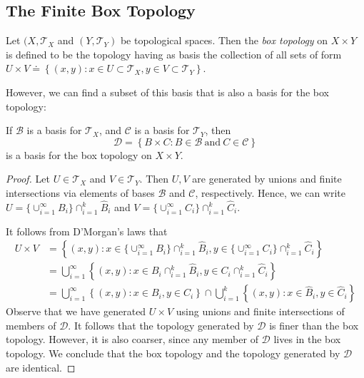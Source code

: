 \subsection{The Finite Box Topology}
\begin{definition}
\label{def:box_topology}
Let $(X, \mathcal{T}_{X}$ and $(Y, \mathcal{T}_{Y})$ be topological spaces.
Then the \emph{box topology} on $X \times Y$ is defined to be the
topology having as basis the collection of all sets of form
\(U \times V \doteq \left\{ (x,y): x \in U \subset
\mathcal{T}_{X}, y \in V \subset \mathcal{T}_{Y}  \right\}\).
\end{definition}
However, we can find a subset of this basis that is also a basis for the box
topology:
\begin{theorem}
\label{thm:box-basis}
If $\mathcal{B}$ is a basis for $\mathcal{T}_{X}$, and
$\mathcal{C}$ is a basis for $\mathcal{T}_{Y}$, then
\begin{equation*}
\mathcal{D} = \left\{ B \times C: B \in \mathcal{B} \ \text{and} \ C \in
\mathcal{C} \right\}
\end{equation*}
is a basis for the box topology on $X \times Y$.
\end{theorem}
\begin{proof}
Let $U \in \mathcal{T}_{X}$ and $V \in \mathcal{T}_{Y}$.
Then $U, V$ are generated by unions and finite intersections via
elements of bases $\mathcal{B}$ and $\mathcal{C}$, respectively.
Hence, we can write
$U = \{\cup_{i=1}^{\infty} B_{i}\} \cap_{i=1}^{k} \hat{B}_{i}$
and $V = \{\cup_{i=1}^{\infty} C_{i}\} \cap_{i=1}^{k} \hat{C}_{i}$.

It follows from D'Morgan's laws that
\begin{align*}
U \times V & = \left\{ (x,y): x \in \{\cup_{i=1}^{\infty} B_{i}\}
\cap_{i=1}^{k} \hat{B}_{i}, y \in \{\cup_{i=1}^{\infty} C_{i}\} \cap_{i=1}^{k}
\hat{C}_{i} \right\} \\
& = \bigcup_{i=1}^{\infty} \left\{ (x,y): x \in B_{i} \cap_{i=1}^{k}
\hat{B}_{i}, y \in C_{i} \cap_{i=1}^{k} \hat{C}_{i} \right\}\\
& = \bigcup_{i=1}^{\infty} \left\{ (x,y): x \in B_{i}, y \in C_{i} \right \}
\cap \bigcup_{i=1}^{k} \left \{ (x,y): x \in \hat{B}_{i}, y \in \hat{C}_{i}
\right\}
\end{align*}
Observe that we have generated $U \times V$ using unions and finite
intersections of members of $\mathcal{D}$. It follows that the topology
generated by $\mathcal{D}$ is finer than the box topology.
However, it is also coarser, since any member of $\mathcal{D}$ lives in the
box topology. We conclude that the box topology and the topology
generated by $\mathcal{D}$ are identical.
\end{proof}
